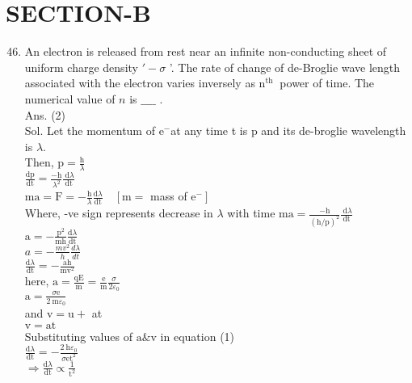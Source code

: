 \documentclass[10pt]{article}
\begin{document}
\section*{SECTION-B}
\begin{enumerate}
  \setcounter{enumi}{45}
  \item An electron is released from rest near an infinite non-conducting sheet of uniform charge density \('-\sigma\) '. The rate of change of de-Broglie wave length associated with the electron varies inversely as \(\mathrm{n}^{\text {th }}\) power of time. The numerical value of \(n\) is \(\_\_\_\_\) .\\
Ans. (2)\\
Sol. Let the momentum of \(\mathrm{e}^{-}\)at any time t is p and its de-broglie wavelength is \(\lambda\).\\
Then, \(\mathrm{p}=\frac{\mathrm{h}}{\lambda}\)\\
\(\frac{\mathrm{dp}}{\mathrm{dt}}=\frac{-\mathrm{h}}{\lambda^{2}} \frac{\mathrm{~d} \lambda}{\mathrm{dt}}\)\\
\(\mathrm{ma}=\mathrm{F}=-\frac{\mathrm{h}}{\lambda} \frac{\mathrm{d} \lambda}{\mathrm{dt}} \quad\left[\mathrm{m}=\right.\) mass of \(\left.\mathrm{e}^{-}\right]\)\\
Where, -ve sign represents decrease in \(\lambda\) with time \(\mathrm{ma}=\frac{-\mathrm{h}}{(\mathrm{h} / \mathrm{p})^{2}} \frac{\mathrm{~d} \lambda}{\mathrm{dt}}\)\\
\(\mathrm{a}=-\frac{\mathrm{p}^{2}}{\mathrm{mh}} \frac{\mathrm{d} \lambda}{\mathrm{dt}}\)\\
\(a=-\frac{m v^{2}}{h} \frac{d \lambda}{d t}\)\\
\(\frac{\mathrm{d} \lambda}{\mathrm{dt}}=-\frac{\mathrm{ah}}{\mathrm{mv}^{2}}\)\\
here, \(\mathrm{a}=\frac{\mathrm{qE}}{\mathrm{m}}=\frac{\mathrm{e}}{\mathrm{m}} \frac{\sigma}{2 \varepsilon_{0}}\)\\
\(\mathrm{a}=\frac{\sigma \mathrm{e}}{2 \mathrm{~m} \varepsilon_{0}}\)\\
and \(\mathrm{v}=\mathrm{u}+\) at\\
\(\mathrm{v}=\mathrm{at}\)\\
Substituting values of \(\mathrm{a} \& \mathrm{v}\) in equation (1)\\
\(\frac{\mathrm{d} \lambda}{\mathrm{dt}}=-\frac{2 \mathrm{~h} \varepsilon_{0}}{\sigma \mathrm{et}^{2}}\)\\
\(\Rightarrow \frac{\mathrm{d} \lambda}{\mathrm{dt}} \propto \frac{1}{\mathrm{t}^{2}}\)\\

\end{enumerate}
\end{document}
